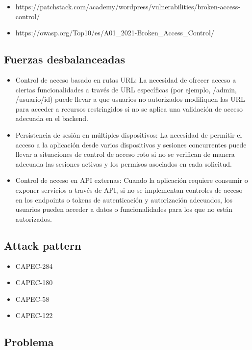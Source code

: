 \begin{itemize}
    \item https://patchstack.com/academy/wordpress/vulnerabilities/broken-access-control/
    \item https://owasp.org/Top10/es/A01\_2021-Broken\_Access\_Control/
\end{itemize}

\subsection{Fuerzas desbalanceadas}

\begin{itemize} 
    \item Control de acceso basado en rutas URL: La necesidad de ofrecer acceso a ciertas funcionalidades a través de URL específicas (por ejemplo, /admin, /usuario/{id}) puede llevar a que usuarios no autorizados modifiquen las URL para acceder a recursos restringidos si no se aplica una validación de acceso adecuada en el backend.
    \item Persistencia de sesión en múltiples dispositivos: La necesidad de permitir el acceso a la aplicación desde varios dispositivos y sesiones concurrentes puede llevar a situaciones de control de acceso roto si no se verifican de manera adecuada las sesiones activas y los permisos asociados en cada solicitud.
    \item Control de acceso en API externas: Cuando la aplicación requiere consumir o exponer servicios a través de API, si no se implementan controles de acceso en los endpoints o tokens de autenticación y autorización adecuados, los usuarios pueden acceder a datos o funcionalidades para los que no están autorizados.
\end{itemize}

\subsection{Attack pattern}

\begin{itemize}
    \item CAPEC-284
    \item CAPEC-180
    \item CAPEC-58
    \item CAPEC-122
\end{itemize}


\subsection{Problema}

